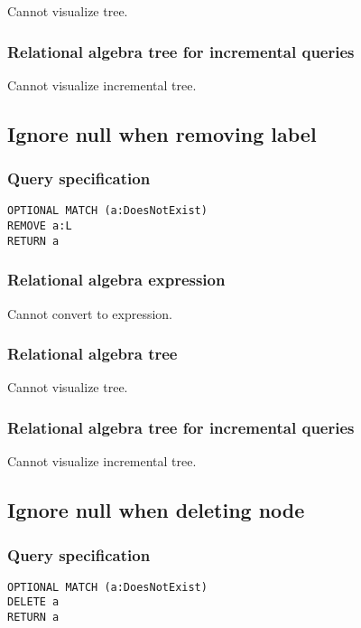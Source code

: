 Cannot visualize tree.

\subsubsection*{Relational algebra tree for incremental queries}

Cannot visualize incremental tree.

\subsection{Ignore null when removing label}

\subsubsection*{Query specification}

\begin{lstlisting}
OPTIONAL MATCH (a:DoesNotExist)
REMOVE a:L
RETURN a
\end{lstlisting}

\subsubsection*{Relational algebra expression}

Cannot convert to expression.

\subsubsection*{Relational algebra tree}

Cannot visualize tree.

\subsubsection*{Relational algebra tree for incremental queries}

Cannot visualize incremental tree.

\subsection{Ignore null when deleting node}

\subsubsection*{Query specification}

\begin{lstlisting}
OPTIONAL MATCH (a:DoesNotExist)
DELETE a
RETURN a
\end{lstlisting}

